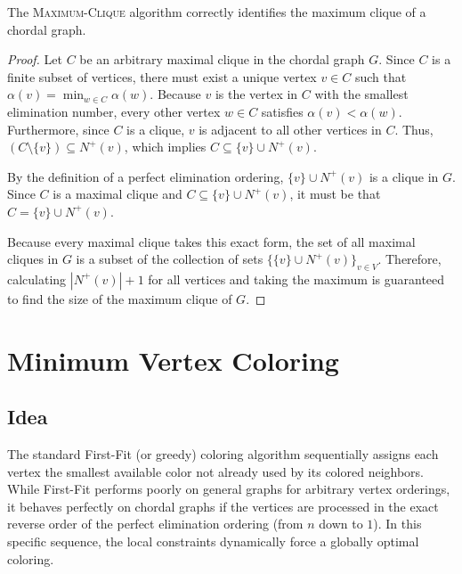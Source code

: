 \begin{theorem}
The \textsc{Maximum-Clique} algorithm correctly identifies the maximum clique of a chordal graph.
\end{theorem}
\begin{proof}
Let $C$ be an arbitrary maximal clique in the chordal graph $G$. Since $C$ is a finite subset of vertices, there must exist a unique vertex $v \in C$ such that $\alpha(v) = \min_{w \in C} \alpha(w)$. Because $v$ is the vertex in $C$ with the smallest elimination number, every other vertex $w \in C$ satisfies $\alpha(v) < \alpha(w)$. Furthermore, since $C$ is a clique, $v$ is adjacent to all other vertices in $C$. Thus, $(C \setminus \{v\}) \subseteq N^+(v)$, which implies $C \subseteq \{v\} \cup N^+(v)$.

By the definition of a perfect elimination ordering, $\{v\} \cup N^+(v)$ is a clique in $G$. Since $C$ is a maximal clique and $C \subseteq \{v\} \cup N^+(v)$, it must be that $C = \{v\} \cup N^+(v)$. 

Because every maximal clique takes this exact form, the set of all maximal cliques in $G$ is a subset of the collection of sets $\{\{v\} \cup N^+(v)\}_{v \in V}$. Therefore, calculating $|N^+(v)| + 1$ for all vertices and taking the maximum is guaranteed to find the size of the maximum clique of $G$.
\end{proof}


\section{Minimum Vertex Coloring}

\subsection{Idea}
The standard First-Fit (or greedy) coloring algorithm sequentially assigns each vertex the smallest available color not already used by its colored neighbors. While First-Fit performs poorly on general graphs for arbitrary vertex orderings, it behaves perfectly on chordal graphs if the vertices are processed in the exact reverse order of the perfect elimination ordering (from $n$ down to $1$). In this specific sequence, the local constraints dynamically force a globally optimal coloring.

